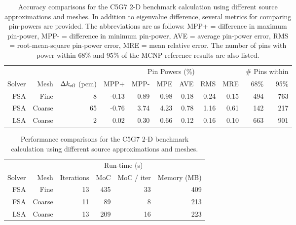 {{{      \begin{table}[htbp]
        \centering
        \caption{
          Accuracy comparisons for the C5G7 2-D benchmark calculation using different source approximations and meshes.
          In addition to eigenvalue difference, several metrics for comparing pin-powers are provided.
          The abbreviations are as follows:
            MPP+ = difference in maximum pin-power, MPP- = difference in minimum pin-power,
            AVE = average pin-power error, RMS = root-mean-square pin-power error,
            MRE = mean relative error.
          The number of pins with power within 68\% and 95\% of the MCNP reference results are also listed.
        }
        \label{tab:LSMOC:C5G7:Results}
        \begin{tabular}{rrrrrrrrrrr}\toprule
                 &      &                     & \multicolumn{6}{c}{Pin Powers (\%)} & \multicolumn{2}{c}{\# Pins within}\\
          Solver & Mesh & $\Delta k_{\text{eff}}$ (pcm) & MPP+ & MPP- & MPE & AVE & RMS & MRE & 68\% & 95\%\\\midrule
          FSA    & Fine    & 8                & -0.13 & 0.89 & 0.98 & 0.18 & 0.24 & 0.15 & 494 & 763\\
          FSA    & Coarse  & 65               & -0.76 & 3.74 & 4.23 & 0.78 & 1.16 & 0.61 & 142 & 217\\
          LSA    & Coarse  & 2                &  0.02 & 0.30 & 0.66 & 0.12 & 0.16 & 0.10 & 663 & 901\\\bottomrule
        \end{tabular}
      \end{table}

      \begin{table}[htbp]
        \centering
        \caption{Performance comparisons for the C5G7 2-D benchmark calculation using different source approximations and meshes.}
        \label{tab:LSMOC:C5G7:Performance}
        \begin{tabular}{rrrrrr}\toprule
                 &      &            & \multicolumn{2}{c}{Run-time (s)} & \\\cline{4-5}
          Solver & Mesh & Iterations & MoC & MoC / iter   & Memory (MB)\\\midrule
          FSA    & Fine   & 13         & 435 & 33         & 409\\
          FSA    & Coarse & 11         &  89 &  8         & 213\\
          LSA    & Coarse & 13         & 209 & 16         & 223\\\bottomrule
        \end{tabular}
      \end{table}

}}}
